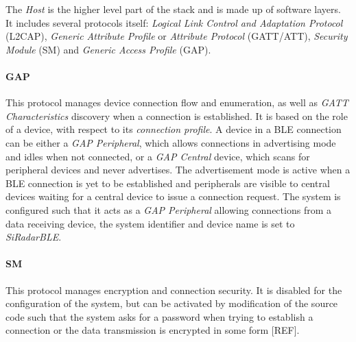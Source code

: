 The \textit{Host} is the higher level part of the stack and is made up of software layers. It includes several protocols itself: \textit{Logical Link Control and Adaptation Protocol} (L2CAP), \textit{Generic Attribute Profile} or \textit{Attribute Protocol} (GATT/ATT), \textit{Security Module} (SM) and \textit{Generic Access Profile} (GAP).

\paragraph{GAP}
This protocol manages device connection flow and enumeration, as well as \textit{GATT Characteristics} discovery when a connection is established. It is based on the role of a device, with respect to its \textit{connection profile}. A device in a BLE connection can be either a \textit{GAP Peripheral}, which allows connections in advertising mode and idles when not connected, or a \textit{GAP Central} device, which scans for peripheral devices and never advertises. The advertisement mode is active when a BLE connection is yet to be established and peripherals are visible to central devices waiting for a central device to issue a connection request. The system is configured such that it acts as a \textit{GAP Peripheral} allowing connections from a data receiving device, the system identifier and device name is set to \textit{SiRadarBLE}.

\paragraph{SM}
This protocol manages encryption and connection security. It is disabled for the configuration of the system, but can be activated by modification of the source code such that the system asks for a password when trying to establish a connection or the data transmission is encrypted in some form [REF].

